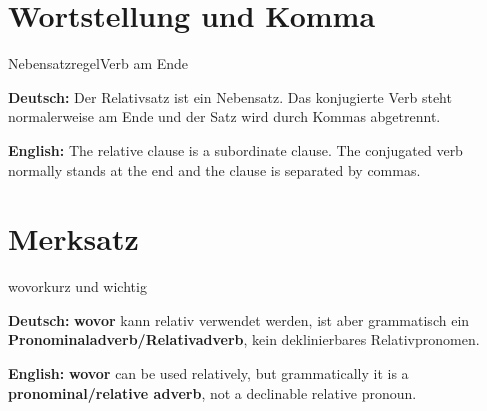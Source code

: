 \documentclass[a4paper,11pt]{article}
\newcommand{\GermanText}[1]{\textbf{Deutsch: }#1\par}
\newcommand{\EnglishText}[1]{{\small\color{SoftGray}\textbf{English: }#1\par}}
\begin{document}
\section{Wortstellung und Komma}

\begin{grammarentry}{Nebensatzregel}{Verb am Ende}

\GermanText{Der Relativsatz ist ein Nebensatz. Das konjugierte Verb steht normalerweise am Ende und der Satz wird durch Kommas abgetrennt.}

\EnglishText{The relative clause is a subordinate clause. The conjugated verb normally stands at the end and the clause is separated by commas.}

\end{grammarentry}

\section{Merksatz}

\begin{grammarentry}{wovor}{kurz und wichtig}

\GermanText{\textbf{wovor} kann relativ verwendet werden, ist aber grammatisch ein \textbf{Pronominaladverb/Relativadverb}, kein deklinierbares Relativpronomen.}

\EnglishText{\textbf{wovor} can be used relatively, but grammatically it is a \textbf{pronominal/relative adverb}, not a declinable relative pronoun.}

\end{grammarentry}
\end{document}
